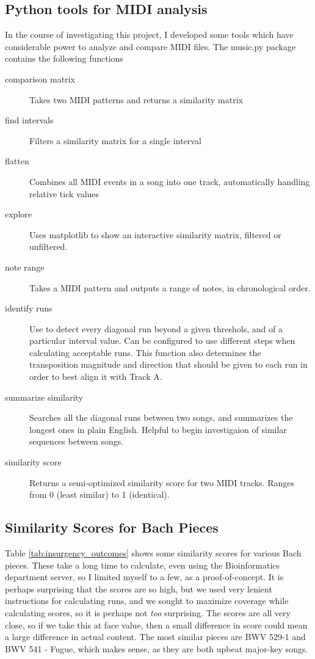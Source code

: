 \documentclass{article}
\begin{document}
\subsection{Python tools for MIDI analysis}
In the course of investigating this project, I developed some tools which have considerable power to analyze and compare MIDI files. The music.py package contains the following functions
\begin{description}
\item[comparison matrix] Takes two MIDI patterns and returns a similarity matrix

\item[find intervals] Filters a similarity matrix for a single interval

\item[flatten] Combines all MIDI events in a song into one track, automatically handling relative tick values

\item[explore] Uses matplotlib to show an interactive similarity matrix, filtered or unfiltered.

\item[note range] Takes a MIDI pattern and outputs a range of notes, in chronological order.

\item[identify runs] Use to detect every diagonal run beyond a given threshols, and of a particular interval value. Can be configured to use different steps when calculating acceptable runs. This function also determines the transposition magnitude and direction that should be given to each run in order to best align it with Track A.

\item[summarize similarity] Searches all the diagonal runs between two songs, and summarizes the longest ones in plain English. Helpful to begin investigaion of similar sequences between songs.

\item[similarity score] Returns a semi-optimized similarity score for two MIDI tracks. Ranges from 0 (least similar) to 1 (identical).
\end{description}

\subsection{Similarity Scores for Bach Pieces}
Table \ref{tab:insurgency_outcomes} shows some similarity scores for various Bach pieces. These take a long time to calculate, even using the Bioinformatics department server, so I limited myself to a few, as a proof-of-concept. It is perhaps surprising that the scores are so high, but we used very lenient instructions for calculating runs, and we sought to maximize coverage while calculating scores, so it is perhaps not \emph{too} surprising. The scores are all very close, so if we take this at face value, then a small difference in score could mean a large difference in actual content. The most similar pieces are BWV 529-1 and BWV 541 - Fugue, which makes sense, as they are both upbeat major-key songs. 
\end{document}
